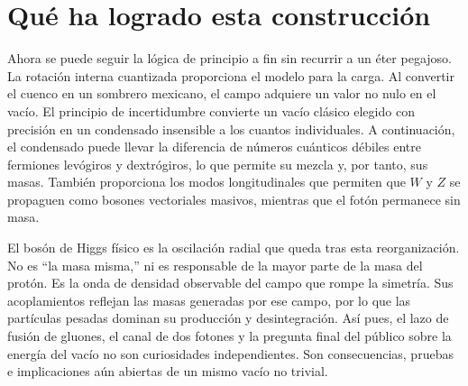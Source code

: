 \begin{classroomqa}
\end{classroomqa}

\begin{classroomqa}
\end{classroomqa}

\section{Qué ha logrado esta construcción}

Ahora se puede seguir la lógica de principio a fin sin recurrir a un éter pegajoso. La rotación interna cuantizada proporciona el modelo para la carga. Al convertir el cuenco en un sombrero mexicano, el campo adquiere un valor no nulo en el vacío. El principio de incertidumbre convierte un vacío clásico elegido con precisión en un condensado insensible a los cuantos individuales. A continuación, el condensado puede llevar la diferencia de números cuánticos débiles entre fermiones levógiros y dextrógiros, lo que permite su mezcla y, por tanto, sus masas. También proporciona los modos longitudinales que permiten que $W$ y $Z$ se propaguen como bosones vectoriales masivos, mientras que el fotón permanece sin masa.

El bosón de Higgs físico es la oscilación radial que queda tras esta reorganización. No es ``la masa misma,'' ni es responsable de la mayor parte de la masa del protón. Es la onda de densidad observable del campo que rompe la simetría. Sus acoplamientos reflejan las masas generadas por ese campo, por lo que las partículas pesadas dominan su producción y desintegración. Así pues, el lazo de fusión de gluones, el canal de dos fotones y la pregunta final del público sobre la energía del vacío no son curiosidades independientes. Son consecuencias, pruebas e implicaciones aún abiertas de un mismo vacío no trivial.
